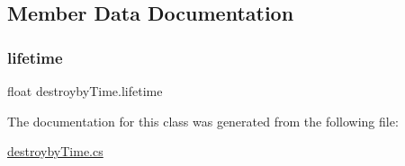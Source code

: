\subsection{Member Data Documentation}
\mbox{\label{classdestroyby_time_ad617cd8d5ba772f54506f8c897792cde}} 
\subsubsection{\texorpdfstring{lifetime}{lifetime}}
{\footnotesize\ttfamily float destroyby\+Time.\+lifetime}



The documentation for this class was generated from the following file\+:\begin{DoxyCompactItemize}
\item 
\mbox{\hyperlink{destroyby_time_8cs}{destroyby\+Time.\+cs}}\end{DoxyCompactItemize}
